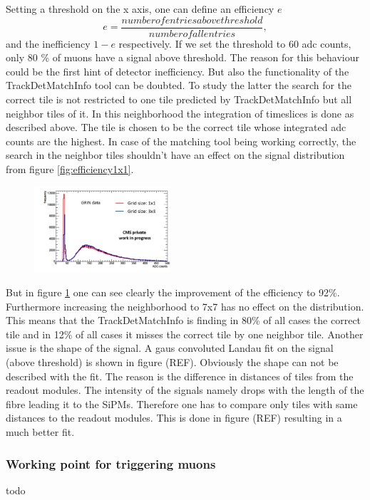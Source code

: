 			Setting a threshold on the x axis, one can define an efficiency $e$
			\begin{equation}
				e = \frac{number of entries above threshold}{number of all entries},
			\end{equation}
			and the inefficiency $1-e$ respectively.
			If we set the threshold to 60 adc counts, only 80 \% of muons have a signal above threshold.
			The reason for this behaviour could be the first hint of detector inefficiency.
			But also the functionality of the TrackDetMatchInfo tool can be doubted.
			To study the latter the search for the correct tile is not restricted to one tile predicted by TrackDetMatchInfo but all neighbor tiles of it.
			In this neighborhood the integration of timeslices is done as described above.
			The tile is chosen to be the correct tile whose integrated adc counts are the highest.
			In case of the matching tool being working correctly, the search in the neighbor tiles shouldn't have an effect on the signal distribution from figure \ref{fig:efficiency1x1}.
			\begin{figure}[htbp]
				\centering
				\includegraphics[width=0.45\textwidth]{Figures/erdogan/neighborhood.png}
				\caption{}
				\label{fig:neighborhood}
			\end{figure}
			But in figure \ref{fig:neighborhood} one can see clearly the improvement of the efficiency to 92\%.
			Furthermore increasing the neighborhood to 7x7 has no effect on the distribution.
			This means that the TrackDetMatchInfo is finding in 80\% of all cases the correct tile and in 12\% of all cases it misses the correct tile by one neighbor tile.
			Another issue is the shape of the signal.
			A gaus convoluted Landau fit on the signal (above threshold) is shown in figure (REF).
			Obviously the shape can not be described with the fit.
			The reason is the difference in distances of tiles from the readout modules.
			The intensity of the signals namely drops with the length of the fibre leading it to the SiPMs.
			Therefore one has to compare only tiles with same distances to the readout modules.
			This is done in figure (REF) resulting in a much better fit.  
		\subsubsection{Working point for triggering muons}
		\label{working_point}
			todo

